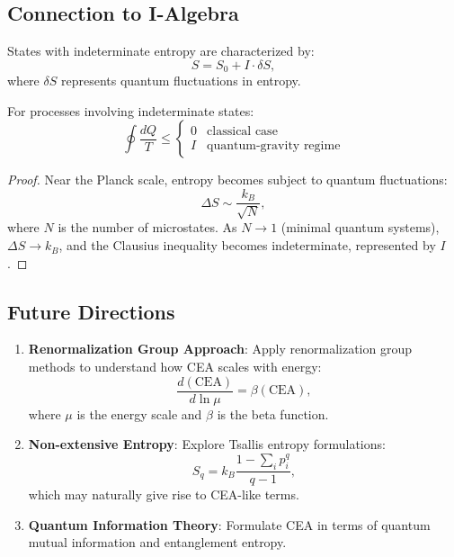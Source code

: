 
\subsection{Connection to I-Algebra}

\begin{definition}
States with indeterminate entropy are characterized by:
\[
S = S_0 + I \cdot \delta S,
\]
where $\delta S$ represents quantum fluctuations in entropy.
\end{definition}

\begin{theorem}
For processes involving indeterminate states:
\[
\oint \frac{dQ}{T} \leq \begin{cases}
0 & \text{classical case} \\
I & \text{quantum-gravity regime}
\end{cases}
\]
\end{theorem}

\begin{proof}
Near the Planck scale, entropy becomes subject to quantum fluctuations:
\[
\Delta S \sim \frac{k_B}{\sqrt{N}},
\]
where $N$ is the number of microstates. As $N \to 1$ (minimal quantum systems), $\Delta S \to k_B$, and the Clausius inequality becomes indeterminate, represented by $I$.
\end{proof}

\subsection{Future Directions}

\begin{enumerate}
\item \textbf{Renormalization Group Approach}: Apply renormalization group methods to understand how CEA scales with energy:
\[
\frac{d(\text{CEA})}{d\ln\mu} = \beta(\text{CEA}),
\]
where $\mu$ is the energy scale and $\beta$ is the beta function.

\item \textbf{Non-extensive Entropy}: Explore Tsallis entropy formulations:
\[
S_q = k_B \frac{1 - \sum_i p_i^q}{q-1},
\]
which may naturally give rise to CEA-like terms.

\item \textbf{Quantum Information Theory}: Formulate CEA in terms of quantum mutual information and entanglement entropy.
\end{enumerate}
